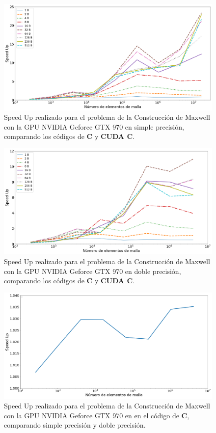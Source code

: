 \begin{figure}[h!]
	\centering
	\includegraphics[width=\textwidth]{figs/cap4/s_970_MxC_simple_10}
	\caption{Speed Up realizado para el problema de la Construcción de Maxwell con la GPU NVIDIA Geforce GTX 970 en simple precisión, comparando los códigos de \textbf{C} y \textbf{CUDA C}.} 
	\label{fig:s_970_MxC_simple_10}	
\end{figure}

\begin{figure}[h!]
	\centering
	\includegraphics[width=\textwidth]{figs/cap4/s_970_MxC_double_10}
	\caption{Speed Up realizado para el problema de la Construcción de Maxwell con la GPU NVIDIA Geforce GTX 970 en doble precisión, comparando los códigos de \textbf{C} y \textbf{CUDA C}.} 
	\label{fig:s_970_MxC_double_10}	
\end{figure}


\begin{figure}[h!]
	\centering
	\includegraphics[width=\textwidth]{figs/cap4/c_970_MxC_c_10}
	\caption{Speed Up realizado para el problema de la Construcción de Maxwell con la GPU NVIDIA Geforce GTX 970 en en el código de \textbf{C}, comparando simple precisión y doble precisión.} 
	\label{fig:c_970_MxC_c_10}	
\end{figure}


